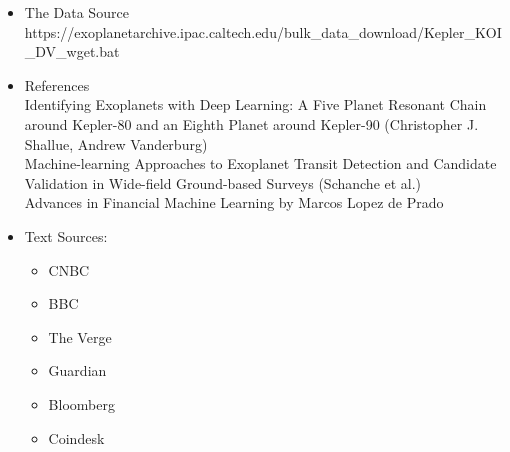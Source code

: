 \documentclass[%
aip,
amsmath,amssymb,
reprint,%
]{revtex4-1}
\begin{document}


\begin{itemize}
\item The Data Source\\
https://exoplanetarchive.ipac.caltech.edu/bulk_data_download/Kepler_KOI_DV_wget.bat
\item References \\
Identifying Exoplanets with Deep Learning: A Five Planet Resonant Chain around Kepler-80 and an Eighth Planet around Kepler-90 (Christopher J. Shallue, Andrew Vanderburg)\\
Machine-learning Approaches to Exoplanet Transit Detection and Candidate Validation in Wide-field Ground-based Surveys (Schanche et al.)\\

Advances in Financial Machine Learning by Marcos Lopez de Prado

\item Text Sources:
	\begin{itemize}
		\item CNBC
		\item BBC
		\item The Verge
		\item Guardian
		\item Bloomberg
		\item Coindesk
	\end{itemize}
\end{itemize}
\end{document}
